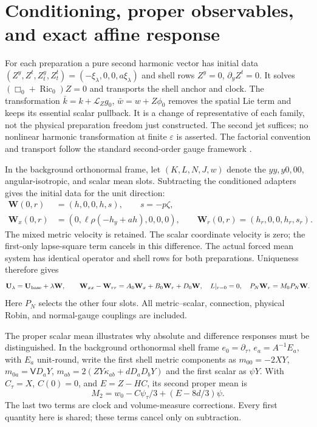 \documentclass[11pt]{article}
\newcommand{\eps}{\varepsilon}
\newcommand{\Lie}{\mathcal L}
\begin{document}
\section{Conditioning, proper observables, and exact affine response}

For each preparation a pure second harmonic vector has initial data
$(Z^y,Z^t,Z^y_t,Z^t_t)=(-\xi_\lambda,0,0,a\xi_\lambda)$ and shell
rows $Z^y=0$, $\partial_yZ^t=0$. It solves
$(\Box_0+\operatorname{Ric}_0)Z=0$ and transports the shell anchor and
clock. The transformation
$\bar k=k+\Lie_Zg_0$, $\bar w=w+Z\phi_0$ removes the spatial Lie term
and keeps its essential scalar pullback. It is a change of representative
of each family, not the physical preparation freedom just constructed.
The second jet suffices; no nonlinear harmonic transformation at finite
$\eps$ is asserted. The factorial convention and transport follow the
standard second-order gauge framework \cite{Bruni,Mars}.

In the background orthonormal frame, let $(K,L,N,J,w)$ denote the
$yy,y0,00$, angular-isotropic, and scalar mean slots. Subtracting the
conditioned adapters gives the initial data for the unit direction:
\begin{equation}
 \begin{aligned}
 \mathbf W(0,r)&=(h,0,0,h,s),\qquad s=-p\zeta,\\
 \mathbf W_x(0,r)&=(0,\ell\rho(-h_y+ah),0,0,0),\qquad
 \mathbf W_r(0,r)=(h_r,0,0,h_r,s_r).
 \end{aligned}\label{eq:initialW}
\end{equation}
The mixed metric velocity is retained. The scalar coordinate velocity is
zero; the first-only lapse-square term cancels in this difference.
The actual forced mean system has identical operator and shell rows for
both preparations. Uniqueness therefore gives
\begin{equation}
 \mathbf U_\lambda=\mathbf U_{\rm base}+\lambda\mathbf W,\qquad
 \mathbf W_{xx}-\mathbf W_{rr}=A_0\mathbf W_x+B_0\mathbf W_r+D_0\mathbf W,
 \quad L|_{r=0}=0,\quad P_N\mathbf W_r=M_0P_N\mathbf W. \label{eq:W}
\end{equation}
Here $P_N$ selects the other four slots. All metric--scalar, connection,
physical Robin, and normal-gauge couplings are included.

The proper scalar mean illustrates why absolute and difference responses
must be distinguished. In the background orthonormal shell frame
$e_0=\partial_\tau$, $e_a=A^{-1}E_a$, with $E_a$ unit-round, write the
first shell metric components as
$m_{00}=-2XY$, $m_{0a}=\mathsf V D_aY$,
$m_{ab}=2(ZY\kappa_{ab}+dD_aD_bY)$ and the first scalar as $\psi Y$.
With $C_\tau=X$, $C(0)=0$, and $E=Z-HC$, its second proper mean is
\begin{equation}
 M_2=w_0-C\psi_\tau/3+(E-8d/3)\psi. \label{eq:propermean}
\end{equation}
The last two terms are clock and volume-measure corrections. Every first
quantity here is shared; these terms cancel only on subtraction.
\end{document}

